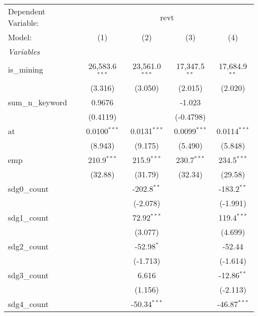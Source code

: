 
\begingroup
\centering
\begin{tabular}{lcccc}
   \tabularnewline \midrule \midrule
   Dependent Variable: & \multicolumn{4}{c}{revt}\\
   Model:            & (1)              & (2)              & (3)             & (4)\\  
   \midrule
   \emph{Variables}\\
   is\_mining        & 26,583.6$^{***}$ & 23,561.0$^{***}$ & 17,347.5$^{**}$ & 17,684.9$^{**}$\\   
                     & (3.316)          & (3.050)          & (2.015)         & (2.020)\\   
   sum\_n\_keyword   & 0.9676           &                  & -1.023          &   \\   
                     & (0.4119)         &                  & (-0.4798)       &   \\   
   at                & 0.0100$^{***}$   & 0.0131$^{***}$   & 0.0099$^{***}$  & 0.0114$^{***}$\\   
                     & (8.943)          & (9.175)          & (5.490)         & (5.848)\\   
   emp               & 210.9$^{***}$    & 215.9$^{***}$    & 230.7$^{***}$   & 234.5$^{***}$\\   
                     & (32.88)          & (31.79)          & (32.34)         & (29.58)\\   
   sdg0\_count       &                  & -202.8$^{**}$    &                 & -183.2$^{**}$\\   
                     &                  & (-2.078)         &                 & (-1.991)\\   
   sdg1\_count       &                  & 72.92$^{***}$    &                 & 119.4$^{***}$\\   
                     &                  & (3.077)          &                 & (4.699)\\   
   sdg2\_count       &                  & -52.98$^{*}$     &                 & -52.44\\   
                     &                  & (-1.713)         &                 & (-1.614)\\   
   sdg3\_count       &                  & 6.616            &                 & -12.86$^{**}$\\   
                     &                  & (1.156)          &                 & (-2.113)\\   
   sdg4\_count       &                  & -50.34$^{***}$   &                 & -46.87$^{***}$\\   

\end{tabular}
